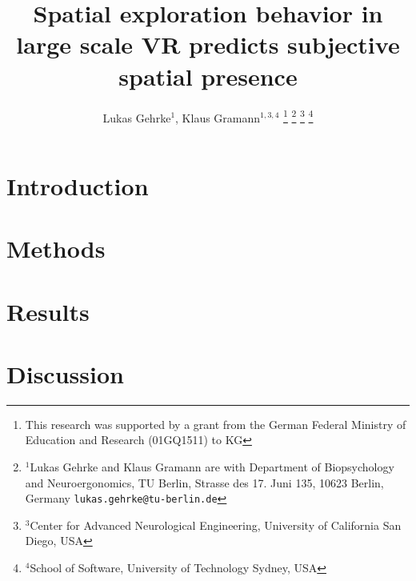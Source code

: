 \documentclass[letterpaper, 10 pt, conference]{ieeeconf}  %
\title{\LARGE \bf Spatial exploration behavior in large scale VR predicts subjective spatial presence}
\author{Lukas Gehrke$^{1}$, Klaus Gramann$^{1,3,4}$%
\thanks{This research was supported by a grant from the German Federal Ministry of Education and Research (01GQ1511) to KG}%
\thanks{$^{1}$Lukas Gehrke and Klaus Gramann are with Department of Biopsychology and Neuroergonomics, TU Berlin, Strasse des 17. Juni 135, 10623 Berlin, Germany
        {\tt\small lukas.gehrke@tu-berlin.de}}%
\thanks{$^{3}$Center for Advanced Neurological Engineering, University of California San Diego, USA}
\thanks{$^{4}$School of Software, University of Technology Sydney, USA}
}
\begin{document}
\maketitle
\thispagestyle{empty}
\pagestyle{empty}

\begin{abstract}

\end{abstract}

\section{Introduction}


\section{Methods}


\section{Results}


\section{Discussion}


\addtolength{\textheight}{-12cm}   %

\begin{thebibliography}{99}

\end{thebibliography}
\end{document}
